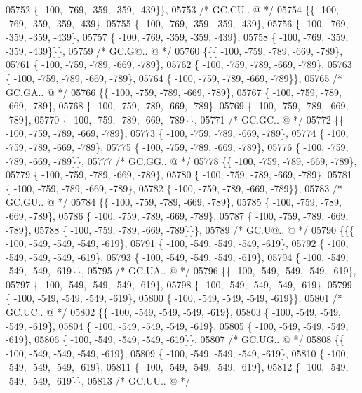 \begin{DoxyCode}
05752 \{ -100, -769, -359, -359, -439\}\},
05753 \textcolor{comment}{/* GC.CU.. @ */}
05754 \{\{ -100, -769, -359, -359, -439\},
05755 \{ -100, -769, -359, -359, -439\},
05756 \{ -100, -769, -359, -359, -439\},
05757 \{ -100, -769, -359, -359, -439\},
05758 \{ -100, -769, -359, -359, -439\}\}\},
05759 \textcolor{comment}{/* GC.G@.. @ */}
05760 \{\{\{ -100, -759, -789, -669, -789\},
05761 \{ -100, -759, -789, -669, -789\},
05762 \{ -100, -759, -789, -669, -789\},
05763 \{ -100, -759, -789, -669, -789\},
05764 \{ -100, -759, -789, -669, -789\}\},
05765 \textcolor{comment}{/* GC.GA.. @ */}
05766 \{\{ -100, -759, -789, -669, -789\},
05767 \{ -100, -759, -789, -669, -789\},
05768 \{ -100, -759, -789, -669, -789\},
05769 \{ -100, -759, -789, -669, -789\},
05770 \{ -100, -759, -789, -669, -789\}\},
05771 \textcolor{comment}{/* GC.GC.. @ */}
05772 \{\{ -100, -759, -789, -669, -789\},
05773 \{ -100, -759, -789, -669, -789\},
05774 \{ -100, -759, -789, -669, -789\},
05775 \{ -100, -759, -789, -669, -789\},
05776 \{ -100, -759, -789, -669, -789\}\},
05777 \textcolor{comment}{/* GC.GG.. @ */}
05778 \{\{ -100, -759, -789, -669, -789\},
05779 \{ -100, -759, -789, -669, -789\},
05780 \{ -100, -759, -789, -669, -789\},
05781 \{ -100, -759, -789, -669, -789\},
05782 \{ -100, -759, -789, -669, -789\}\},
05783 \textcolor{comment}{/* GC.GU.. @ */}
05784 \{\{ -100, -759, -789, -669, -789\},
05785 \{ -100, -759, -789, -669, -789\},
05786 \{ -100, -759, -789, -669, -789\},
05787 \{ -100, -759, -789, -669, -789\},
05788 \{ -100, -759, -789, -669, -789\}\}\},
05789 \textcolor{comment}{/* GC.U@.. @ */}
05790 \{\{\{ -100, -549, -549, -549, -619\},
05791 \{ -100, -549, -549, -549, -619\},
05792 \{ -100, -549, -549, -549, -619\},
05793 \{ -100, -549, -549, -549, -619\},
05794 \{ -100, -549, -549, -549, -619\}\},
05795 \textcolor{comment}{/* GC.UA.. @ */}
05796 \{\{ -100, -549, -549, -549, -619\},
05797 \{ -100, -549, -549, -549, -619\},
05798 \{ -100, -549, -549, -549, -619\},
05799 \{ -100, -549, -549, -549, -619\},
05800 \{ -100, -549, -549, -549, -619\}\},
05801 \textcolor{comment}{/* GC.UC.. @ */}
05802 \{\{ -100, -549, -549, -549, -619\},
05803 \{ -100, -549, -549, -549, -619\},
05804 \{ -100, -549, -549, -549, -619\},
05805 \{ -100, -549, -549, -549, -619\},
05806 \{ -100, -549, -549, -549, -619\}\},
05807 \textcolor{comment}{/* GC.UG.. @ */}
05808 \{\{ -100, -549, -549, -549, -619\},
05809 \{ -100, -549, -549, -549, -619\},
05810 \{ -100, -549, -549, -549, -619\},
05811 \{ -100, -549, -549, -549, -619\},
05812 \{ -100, -549, -549, -549, -619\}\},
05813 \textcolor{comment}{/* GC.UU.. @ */}

\end{DoxyCode}
